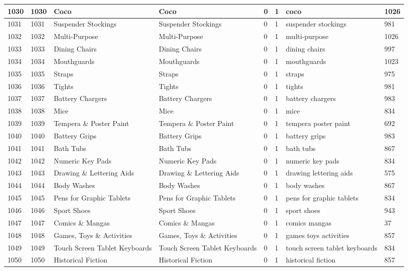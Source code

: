 \begin{longtable}{|l|l|l|l|l|l|l|l|}
1030 & 1030 & Coco & Coco & 0 & 1 & coco & 1026 \\ \hline 
1031 & 1031 & Suspender Stockings & Suspender Stockings & 0 & 1 & suspender stockings & 981 \\ \hline 
1032 & 1032 & Multi-Purpose & Multi-Purpose & 0 & 1 & multi-purpose & 1026 \\ \hline 
1033 & 1033 & Dining Chairs & Dining Chairs & 0 & 1 & dining chairs & 997 \\ \hline 
1034 & 1034 & Mouthguards & Mouthguards & 0 & 1 & mouthguards & 1023 \\ \hline 
1035 & 1035 & Straps & Straps & 0 & 1 & straps & 975 \\ \hline 
1036 & 1036 & Tights & Tights & 0 & 1 & tights & 981 \\ \hline 
1037 & 1037 & Battery Chargers & Battery Chargers & 0 & 1 & battery chargers & 983 \\ \hline 
1038 & 1038 & Mice & Mice & 0 & 1 & mice & 834 \\ \hline 
1039 & 1039 & Tempera \& Poster Paint & Tempera \& Poster Paint & 0 & 1 & tempera poster paint & 692 \\ \hline 
1040 & 1040 & Battery Grips & Battery Grips & 0 & 1 & battery grips & 983 \\ \hline 
1041 & 1041 & Bath Tubs & Bath Tubs & 0 & 1 & bath tubs & 867 \\ \hline 
1042 & 1042 & Numeric Key Pads & Numeric Key Pads & 0 & 1 & numeric key pads & 834 \\ \hline 
1043 & 1043 & Drawing \& Lettering Aids & Drawing \& Lettering Aids & 0 & 1 & drawing lettering aids & 575 \\ \hline 
1044 & 1044 & Body Washes & Body Washes & 0 & 1 & body washes & 867 \\ \hline 
1045 & 1045 & Pens for Graphic Tablets & Pens for Graphic Tablets & 0 & 1 & pens for graphic tablets & 834 \\ \hline 
1046 & 1046 & Sport Shoes & Sport Shoes & 0 & 1 & sport shoes & 943 \\ \hline 
1047 & 1047 & Comics \& Mangas & Comics \& Mangas & 0 & 1 & comics mangas & 37 \\ \hline 
1048 & 1048 & Games, Toys \& Activities & Games, Toys \& Activities & 0 & 1 & games toys activities & 857 \\ \hline 
1049 & 1049 & Touch Screen Tablet Keyboards & Touch Screen Tablet Keyboards & 0 & 1 & touch screen tablet keyboards & 834 \\ \hline 
1050 & 1050 & Historical Fiction & Historical Fiction & 0 & 1 & historical fiction & 857 \\ \hline 

\end{longtable}
